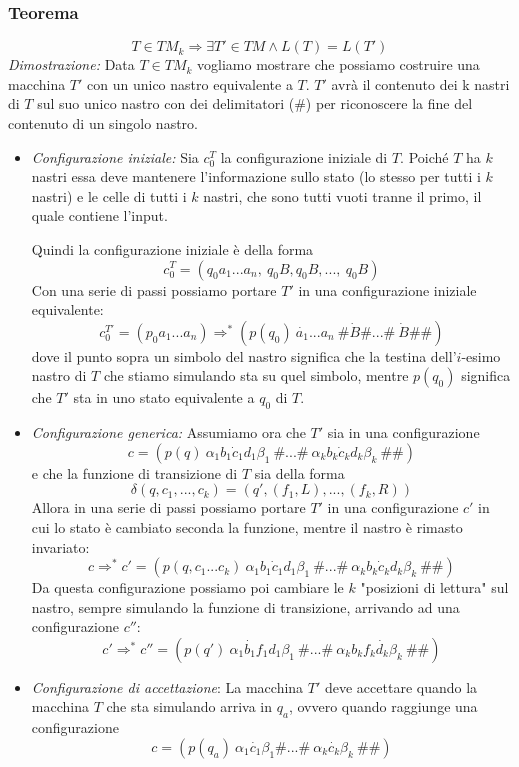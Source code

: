 \subsubsection{Teorema}
\[
	T \in TM_k \Rightarrow \exists T' \in TM \land L(T) = L(T')
\] 
\textit{Dimostrazione:} Data $T \in TM_k$ vogliamo mostrare che possiamo costruire una macchina $T'$ con un unico nastro equivalente a $T$. $T'$ avrà il contenuto dei k nastri di $T$ sul suo unico nastro con dei delimitatori ($\#$) per riconoscere la fine del contenuto di un singolo nastro.
	\begin{itemize}
		\item \textit{Configurazione iniziale:} Sia $c_0^T$ la configurazione iniziale di $T$. Poiché $T$ ha $k$ nastri essa deve mantenere l'informazione sullo stato (lo stesso per tutti i $k$ nastri) e le celle di tutti i $k$ nastri, che sono tutti vuoti tranne il primo, il quale contiene l'input. 
		
		Quindi la configurazione iniziale è della forma
		$$c_0^T = (q_0 a_1...a_n, \  q_0B, q_0B, ...,\  q_0B)$$
		Con una serie di passi possiamo portare $T'$ in una configurazione iniziale equivalente:
		$$c_0^{T'} = (p_0 a_1...a_n) \Rightarrow^* (p(q_0) \ \dot{a_1}...a_n \ \# \dot{B} \# ... \# \ \dot{B} \#\#)$$
		dove il punto sopra un simbolo del nastro significa che la testina dell'$i$-esimo nastro di $T$ che stiamo simulando sta su quel simbolo, mentre $p(q_0)$ significa che $T'$ sta in uno stato equivalente a $q_0$ di $T$.
		\item \textit{Configurazione generica:} Assumiamo ora che $T'$ sia in una configurazione
		\[
			c = (p(q)\ \alpha_1 b_1 \dot{c}_1 d_1 \beta_1 \  \# ... \# \ \alpha_k b_k \dot{c}_k d_k \beta_k \ \#\#)
		\]
		e che la funzione di transizione di $T$ sia della forma
		\[
			\delta(q, c_1, ..., c_k) = (q', (f_1, L), ..., (f_k, R))
		\]
		Allora in una serie di passi possiamo portare $T'$ in una configurazione $c'$ in cui lo stato è cambiato seconda la funzione, mentre il nastro è rimasto invariato:
		$$c \Rightarrow^* c' = (p(q, c_1...c_k) \ \alpha_1 b_1 \dot{c}_1 d_1 \beta_1 \ \# ... \# \  \alpha_k b_k \dot{c}_k d_k \beta_k \ \#\#)$$
		Da questa configurazione possiamo poi cambiare le $k$ "posizioni di lettura" sul nastro, sempre simulando la funzione di transizione, arrivando ad una configurazione $c''$:
		\[
			c' \Rightarrow^* c'' = (p(q') \ \alpha_1 \dot{b_1} f_1 d_1 \beta_1 \ \# ... \# \  \alpha_k b_k f_k \dot{d_k} \beta_k \ \#\#)
		\] 
		
		\item \textit{Configurazione di accettazione}:
		La macchina $T'$ deve accettare quando la macchina $T$ che sta simulando arriva in $q_a$, ovvero quando raggiunge una configurazione
		$$
		c = (p(q_a) \ \alpha_1 \dot{c_1} \beta_1  \# ... \# \  \alpha_k \dot{c_k} \beta_k \ \#\#)
		$$ 
	\end{itemize}
